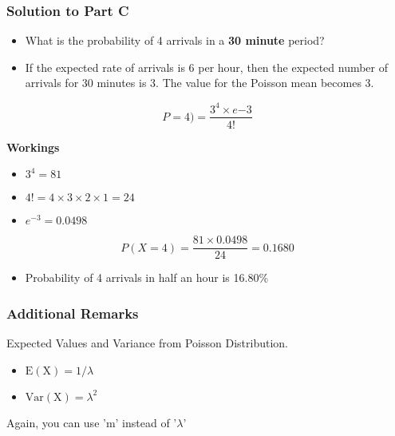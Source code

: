 \documentclass[a4paper,12pt]{article}
\begin{document}
\subsubsection*{Solution to Part C}

\begin{itemize}
\item What is the probability of 4 arrivals in a \textbf{30 minute} period?
\item If the expected rate of arrivals is 6 per hour, then the expected number of arrivals for 30 minutes is 3.
The value for the Poisson mean becomes 3.
\end{itemize}


\[P=4) =\frac{3^4 \times e{-3}}{4!}\]

\textbf{Workings}
\begin{itemize}
	\item $3^4 =81$
	\item $4! =4\times 3 \times 2 \times 1 = 24 $
	\item $e^{-3}= 0.0498 $
\end{itemize}


\[P(X=4) =\frac{81  \times 0.0498}{24}= 0.1680\]

\begin{itemize}
\item Probability of 4 arrivals in half an hour is 16.80\%
\end{itemize}

\bigskip

\subsubsection*{Additional Remarks}
Expected Values and Variance from Poisson Distribution.

\begin{itemize}
\item $\operatorname{E(X)} = 1/\lambda$ 
\item $\operatorname{Var(X)} = \lambda^2$
\end{itemize}
Again, you can use 'm' instead of '$\lambda$' 

 
			
\end{document}
